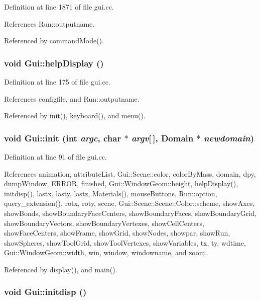 Definition at line 1871 of file gui.cc.

References Run::outputname.

Referenced by commandMode().\hypertarget{namespaceGui_0e5d9f6cb4fd8f9ddb9f214e12b4e6e5}{
\subsubsection[{helpDisplay}]{\setlength{\rightskip}{0pt plus 5cm}void Gui::helpDisplay ()}}
\label{namespaceGui_0e5d9f6cb4fd8f9ddb9f214e12b4e6e5}




Definition at line 175 of file gui.cc.

References configfile, and Run::outputname.

Referenced by init(), keyboard(), and menu().\hypertarget{namespaceGui_c7a8f5580648139e0b12062692cdf4d5}{
\subsubsection[{init}]{\setlength{\rightskip}{0pt plus 5cm}void Gui::init (int {\em argc}, \/  char $\ast$ {\em argv}\mbox{[}$\,$\mbox{]}, \/  {\bf Domain} $\ast$ {\em newdomain})}}
\label{namespaceGui_c7a8f5580648139e0b12062692cdf4d5}




Definition at line 91 of file gui.cc.

References animation, attributeList, Gui::Scene::color, colorByMass, domain, dpy, dumpWindow, ERROR, finished, Gui::WindowGeom::height, helpDisplay(), initdisp(), lastx, lasty, lastz, Materials(), mouseButtons, Run::option, query\_\-extension(), rotx, roty, scene, Gui::Scene::Scene::Color::scheme, showAxes, showBonds, showBoundaryFaceCenters, showBoundaryFaces, showBoundaryGrid, showBoundaryVectors, showBoundaryVertexes, showCellCenters, showFaceCenters, showFrame, showGrid, showNodes, showpar, showRun, showSpheres, showToolGrid, showToolVertexes, showVariables, tx, ty, wdtime, Gui::WindowGeom::width, win, window, windowname, and zoom.

Referenced by display(), and main().\hypertarget{namespaceGui_6d4b87c2b4664134825955c4ff89f2df}{
\subsubsection[{initdisp}]{\setlength{\rightskip}{0pt plus 5cm}void Gui::initdisp ()}}
\label{namespaceGui_6d4b87c2b4664134825955c4ff89f2df}




